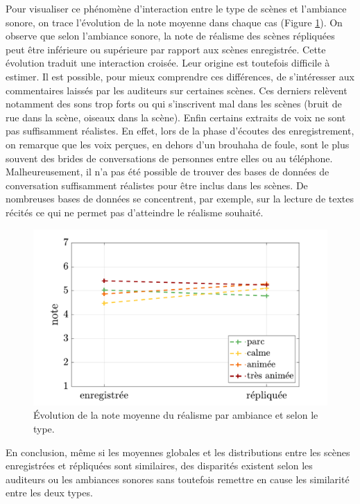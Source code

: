 Pour visualiser ce phénomène d'interaction entre le type de scènes et l'ambiance sonore, on trace l'évolution de la note moyenne dans chaque cas (Figure \ref{fig:interaction_ambianceType}). On observe que selon l'ambiance sonore, la note de réalisme des scènes répliquées peut être inférieure ou supérieure par rapport aux scènes enregistrée. Cette évolution traduit une interaction croisée. Leur origine est toutefois difficile à estimer. Il est possible, pour mieux comprendre ces différences, de s'intéresser aux commentaires laissés par les auditeurs sur certaines scènes. Ces derniers relèvent notamment des sons trop forts ou qui s'inscrivent mal dans les scènes (bruit de rue dans la scène, oiseaux dans la scène). Enfin certains extraits de voix ne sont pas suffisamment réalistes. En effet, lors de la phase d'écoutes des enregistrement, on remarque que les voix perçues, en dehors d'un brouhaha de foule, sont le plus souvent des brides de conversations de personnes entre elles ou au téléphone. Malheureusement, il n'a pas été possible de trouver des bases de données de conversation suffisamment réalistes pour être inclus dans les scènes. De nombreuses bases de données se concentrent, par exemple, sur la lecture de textes récités ce qui ne permet pas d'atteindre le réalisme souhaité.

\begin{figure}[h]
\centering
\includegraphics[width=0.8\linewidth]{./figures/test_perceptif/testPerceptif_interactionAmbiance.pdf} 
\caption{Évolution de la note moyenne du réalisme par ambiance et selon le type.}\label{fig:interaction_ambianceType}
\end{figure}


En conclusion, même si les moyennes globales et les distributions entre les scènes enregistrées et répliquées sont similaires, des disparités existent selon les auditeurs ou les ambiances sonores sans toutefois remettre en cause les similarité entre les deux types.



